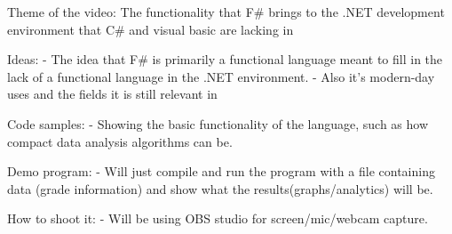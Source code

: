Theme of the video: 	The functionality that F# brings to the .NET development environment that C# and visual basic are lacking in

Ideas: 			- The idea that F# is primarily a functional language meant to fill in the lack of a functional language in the .NET environment.
       			- Also it's modern-day uses and the fields it is still relevant in

Code samples:		- Showing the basic functionality of the language, such as how compact data analysis algorithms can be.

Demo program:		- Will just compile and run the program with a file containing data (grade information) and show what the results(graphs/analytics) will be.

How to shoot it:	- Will be using OBS studio for screen/mic/webcam capture.
